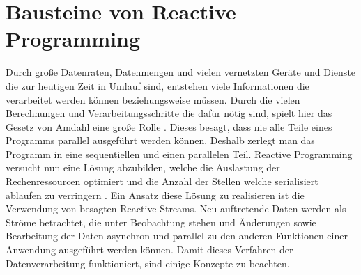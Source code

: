 \chapter{Bausteine von Reactive Programming}\label{realisierung} 
Durch große Datenraten, Datenmengen und vielen vernetzten Geräte und Dienste die zur heutigen Zeit in Umlauf sind, entstehen viele Informationen die verarbeitet werden können beziehungsweise müssen. Durch die vielen Berechnungen und Verarbeitungsschritte die dafür nötig sind, spielt hier das Gesetz von Amdahl eine große Rolle \cite{Amdahl.}. Dieses besagt, dass nie alle Teile eines Programms parallel ausgeführt werden können. Deshalb zerlegt man das Programm in eine sequentiellen und einen parallelen Teil. Reactive Programming versucht nun eine Lösung abzubilden, welche die Auslastung der Rechenressourcen optimiert und die Anzahl der Stellen welche serialisiert ablaufen zu verringern \cite{Boner.}. Ein Ansatz diese Lösung zu realisieren ist die Verwendung von besagten Reactive Streams. Neu auftretende Daten werden als Ströme betrachtet, die unter Beobachtung stehen und Änderungen sowie Bearbeitung der Daten asynchron und parallel zu den anderen Funktionen einer Anwendung ausgeführt werden können. Damit dieses Verfahren der Datenverarbeitung funktioniert, sind einige Konzepte zu beachten.
